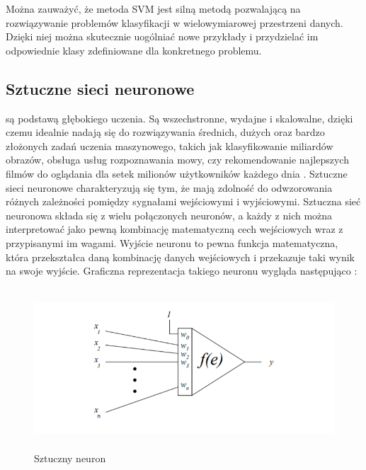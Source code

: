 Można zauważyć, że metoda SVM jest silną metodą pozwalającą na rozwiązywanie problemów klasyfikacji w wielowymiarowej przestrzeni danych. Dzięki niej można skutecznie uogólniać nowe przykłady i przydzielać im odpowiednie klasy zdefiniowane dla konkretnego problemu.

\newpage

\subsection{Sztuczne sieci neuronowe}
\label{SNN-opis}
\noindent
{} są podstawą głębokiego uczenia. Są wszechstronne, wydajne i skalowalne, dzięki czemu idealnie nadają się do rozwiązywania średnich, dużych oraz bardzo złożonych zadań uczenia maszynowego, takich jak klasyfikowanie miliardów obrazów, obsługa usług rozpoznawania mowy, czy rekomendowanie najlepszych filmów do oglądania dla setek milionów użytkowników każdego dnia \cite{Geron}. Sztuczne sieci neuronowe charakteryzują się tym, że mają zdolność do odwzorowania różnych zależności pomiędzy sygnałami wejściowymi i wyjściowymi. Sztuczna sieć neuronowa składa się z wielu połączonych neuronów, a każdy z nich można interpretować jako pewną kombinację matematyczną cech wejściowych wraz z przypisanymi im wagami. Wyjście neuronu to pewna funkcja matematyczna, która przekształca daną kombinację danych wejściowych i przekazuje taki wynik na swoje wyjście. Graficzna reprezentacja takiego neuronu wygląda następująco \cite{Prezentacja:SNN} \cite{KrawiecStefanowski03}:
\begin{figure}[H] 
        \centering\includegraphics[width=12cm,height=6cm]{figures/SNN.png}
        \caption{Sztuczny neuron}\label{SVM-neuron}
\end{figure}

